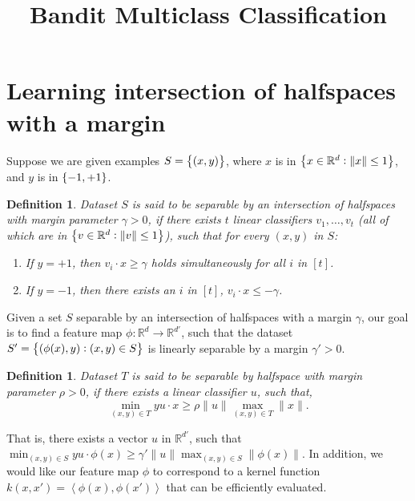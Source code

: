 \documentclass{article}
\title{Bandit Multiclass Classification}
\newcommand{\field}[1]{\mathbb{#1}}
\newcommand{\fR}{\field{R}}
\newcommand{\inner}[1]{ \left\langle {#1} \right\rangle }
\newtheorem{definition}[theorem]{Definition}
\begin{document}

\maketitle

\section{Learning intersection of halfspaces with a margin}
Suppose we are given examples $S = \cbr{(x, y)}$, where $x$ is in $\cbr{x \in \fR^d: \| x \| \leq 1}$, and $y$ is in $\cbr{-1,+1}$.
\begin{definition}
Dataset $S$ is said to be separable by an intersection of halfspaces with margin parameter $\gamma > 0$, if there exists $t$ linear classifiers $v_1, \ldots, v_t$ (all of which are in $\cbr{v \in \fR^d: \| v \| \leq 1}$),
such that for every $(x,y)$ in $S$:
\begin{enumerate}
  \item If $y = +1$, then $v_i \cdot x \geq \gamma$ holds simultaneously for all $i$ in $[t]$.
  \item If $y = -1$, then there exists an $i$ in $[t]$, $v_i \cdot x \leq -\gamma$.
\end{enumerate}
\label{def:int-margin}
\end{definition}

Given a set $S$ separable by an intersection of halfspaces with a margin $\gamma$, our goal is to find a feature map $\phi: \fR^d \to \fR^{d'}$, such that the dataset $S' = \cbr{(\phi(x), y): (x,y) \in S}$ is linearly separable by a margin $\gamma' > 0$.
\begin{definition}
Dataset $T$ is said to be separable by halfspace with margin parameter $\rho > 0$, if there exists a linear classifier $u$, such that,
\[ \min_{(x,y) \in T} y u \cdot x \geq \rho \|u\| \max_{(x,y) \in T} \| x \|. \]
\end{definition}

That is,
there exists a vector $u$ in $\fR^{d'}$, such that $\min_{(x,y) \in S} y u \cdot \phi(x) \geq \gamma' \|u\| \max_{(x,y) \in S} \| \phi(x) \|$.
In addition, we would like our feature map $\phi$ to correspond to a kernel function $k(x,x') = \inner{\phi(x), \phi(x')}$ that can be efficiently evaluated.
\end{document}
